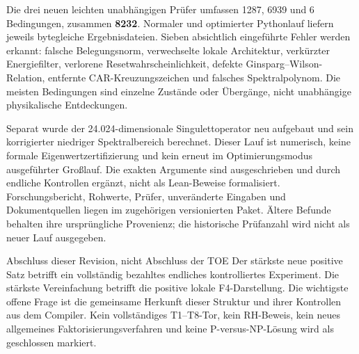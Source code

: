 Die drei neuen leichten unabhängigen Prüfer umfassen 1287, 6939 und 6 Bedingungen, zusammen \textbf{8232}. Normaler und optimierter Pythonlauf liefern jeweils bytegleiche Ergebnisdateien. Sieben absichtlich eingeführte Fehler werden erkannt: falsche Belegungsnorm, verwechselte lokale Architektur, verkürzter Energiefilter, verlorene Resetwahrscheinlichkeit, defekte Ginsparg--Wilson-Relation, entfernte CAR-Kreuzungszeichen und falsches Spektralpolynom. Die meisten Bedingungen sind einzelne Zustände oder Übergänge, nicht unabhängige physikalische Entdeckungen.

Separat wurde der 24.024-dimensionale Singulettoperator neu aufgebaut und sein korrigierter niedriger Spektralbereich berechnet. Dieser Lauf ist numerisch, keine formale Eigenwertzertifizierung und kein erneut im Optimierungsmodus ausgeführter Großlauf. Die exakten Argumente sind ausgeschrieben und durch endliche Kontrollen ergänzt, nicht als Lean-Beweise formalisiert. Forschungsbericht, Rohwerte, Prüfer, unveränderte Eingaben und Dokumentquellen liegen im zugehörigen versionierten Paket. Ältere Befunde behalten ihre ursprüngliche Provenienz; die historische Prüfanzahl wird nicht als neuer Lauf ausgegeben.

\begin{grenze}{Abschluss dieser Revision, nicht Abschluss der TOE}
Der stärkste neue positive Satz betrifft ein vollständig bezahltes endliches kontrolliertes Experiment. Die stärkste Vereinfachung betrifft die positive lokale F4-Darstellung. Die wichtigste offene Frage ist die gemeinsame Herkunft dieser Struktur und ihrer Kontrollen aus dem Compiler. Kein vollständiges T1--T8-Tor, kein RH-Beweis, kein neues allgemeines Faktorisierungsverfahren und keine P-versus-NP-Lösung wird als geschlossen markiert.
\end{grenze}
